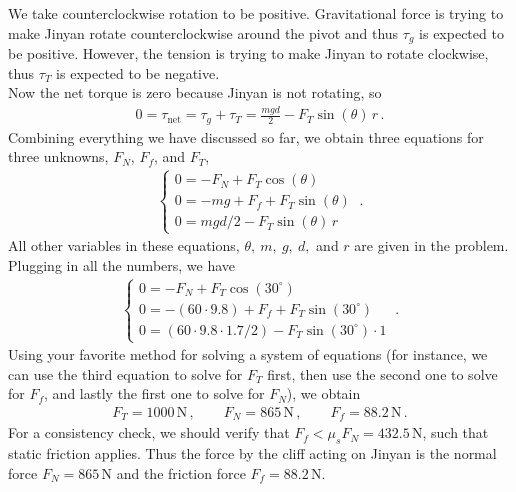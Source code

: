 \documentclass[11pt]{article}
\begin{document}
We take counterclockwise rotation to be positive. Gravitational force is trying to make Jinyan rotate counterclockwise around the pivot and thus $\tau_g$ is expected to be positive. However, the tension is trying to make Jinyan to rotate clockwise, thus $\tau_T$ is expected to be negative. \\

Now the net torque is zero because Jinyan is not rotating, so
\begin{align*}
0=\tau_{\text{net}} = \tau_g + \tau_T = \frac{mgd}{2} - F_T\sin(\theta)\,r\,.
\end{align*}
Combining everything we have discussed so far, we obtain three equations for three unknowns, $F_N$, $F_f$, and $F_T$,
\begin{align*}
\begin{cases}
0 = -F_N + F_T \cos(\theta)\\
0= -mg + F_f + F_T \sin(\theta)\\
0 = mgd/2 - F_T \sin(\theta)\, r\end{cases}\ .
\end{align*}
All other variables in these equations, $\theta,\ m,\ g,\ d,$ and $r$ are given in the problem. Plugging in all the numbers, we have
\begin{align*}
\begin{cases}
0 = -F_N + F_T \cos(30^\circ)\\
0= -(60\cdot 9.8) + F_f + F_T \sin(30^\circ)\\
0 =  (60\cdot 9.8\cdot 1.7/2) - F_T \sin(30^\circ) \cdot 1
\end{cases}\ .
\end{align*} 
Using your favorite method for solving a system of equations (for instance, we can use the third equation to solve for $F_T$ first, then use the second one to solve for $F_f$, and lastly the first one to solve for $F_N$), we obtain 
\begin{align*}
F_T = 1000\,\text{N}\,,\qquad
F_N = 865\,\text{N}\,,\qquad
F_f = 88.2\,\text{N}\,.
\end{align*}
For a consistency check, we should verify that $F_f < \mu_s F_N = 432.5\,\text{N}$, such that static friction applies. Thus the force by the cliff acting on Jinyan is the normal force $F_N = 865$\,N and the friction force $F_f = 88.2$\,N. 
\end{document}
